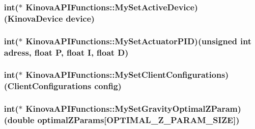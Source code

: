 \subsubsection[{\texorpdfstring{My\+Set\+Active\+Device}{MySetActiveDevice}}]{\setlength{\rightskip}{0pt plus 5cm}int($\ast$ Kinova\+A\+P\+I\+Functions\+::\+My\+Set\+Active\+Device)(Kinova\+Device device)}\hypertarget{classKinovaAPIFunctions_a6da4f8a8cb0a630cf94a761f3c96a279}{}\label{classKinovaAPIFunctions_a6da4f8a8cb0a630cf94a761f3c96a279}
\subsubsection[{\texorpdfstring{My\+Set\+Actuator\+P\+ID}{MySetActuatorPID}}]{\setlength{\rightskip}{0pt plus 5cm}int($\ast$ Kinova\+A\+P\+I\+Functions\+::\+My\+Set\+Actuator\+P\+ID)(unsigned int adress, float P, float I, float D)}\hypertarget{classKinovaAPIFunctions_a82347afb2e50ad710b1cec3a86e77a40}{}\label{classKinovaAPIFunctions_a82347afb2e50ad710b1cec3a86e77a40}
\subsubsection[{\texorpdfstring{My\+Set\+Client\+Configurations}{MySetClientConfigurations}}]{\setlength{\rightskip}{0pt plus 5cm}int($\ast$ Kinova\+A\+P\+I\+Functions\+::\+My\+Set\+Client\+Configurations)(Client\+Configurations config)}\hypertarget{classKinovaAPIFunctions_a73351e91fcffbb7ec2bf5a42bdd041f0}{}\label{classKinovaAPIFunctions_a73351e91fcffbb7ec2bf5a42bdd041f0}
\subsubsection[{\texorpdfstring{My\+Set\+Gravity\+Optimal\+Z\+Param}{MySetGravityOptimalZParam}}]{\setlength{\rightskip}{0pt plus 5cm}int($\ast$ Kinova\+A\+P\+I\+Functions\+::\+My\+Set\+Gravity\+Optimal\+Z\+Param)(double optimal\+Z\+Params\mbox{[}O\+P\+T\+I\+M\+A\+L\+\_\+\+Z\+\_\+\+P\+A\+R\+A\+M\+\_\+\+S\+I\+ZE\mbox{]})}\hypertarget{classKinovaAPIFunctions_ae1ae1eadcee874446b8bb417c84b0dcb}{}\label{classKinovaAPIFunctions_ae1ae1eadcee874446b8bb417c84b0dcb}

